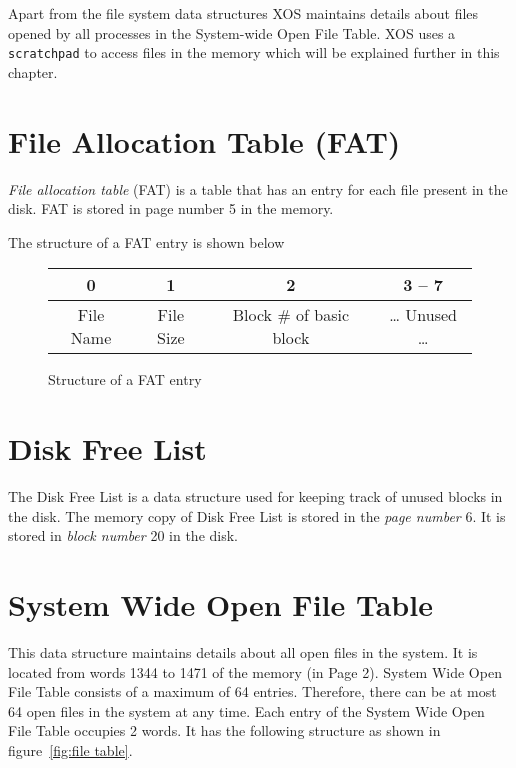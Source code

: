 \documentclass[10pt]{report}
\begin{document}
 Apart from the file system data structures XOS maintains details about files opened by all processes in the System-wide Open File Table. XOS uses a \texttt{scratchpad} to access files in the memory which will be explained further in this chapter.
 

\section{File Allocation Table (FAT)}
\label{sec:fat}
\emph{File allocation table} (FAT) is a table that has an entry for each file present in the disk. FAT is stored in page number 5 in the memory. \\



The structure of a FAT entry is shown below 

\begin{figure}[htp!] \small
	\centering
	\begin{tabular}{|c|c|c|c|}
		\hline
		0 & 1 & 2 & 3 -- 7 \\
		\hline
		File Name & File Size & Block \# of basic block & \dots{} Unused \dots \\
		\hline
	\end{tabular}
	\caption{Structure of a FAT entry}
	\label{fig:fat_entry}
\end{figure}



\section{Disk Free List}
\label{sec:disk free list}
The Disk Free List is a data structure used for keeping track of unused blocks in the disk. The memory copy of Disk Free List is stored in the \textit{page number} 6. It is stored in \textit{block number} 20 in the disk. 


\section{System Wide Open File Table}
\label{sec:file table}
	
This data structure maintains details about all open files in the system. It is located from words 1344 to 1471 of the memory (in Page 2). System Wide Open File Table consists of a maximum of 64 entries. 
Therefore, there can be at most 64 open files in the system at any time. Each entry of the System Wide Open File Table occupies 2 words. It has the following structure as shown in figure~\ref{fig:file table}.
\end{document}
